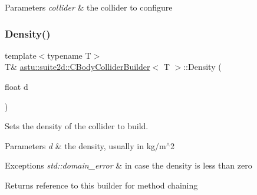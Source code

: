 \begin{DoxyParams}{Parameters}
{\em collider} & the collider to configure \\
\hline
\end{DoxyParams}
\mbox{\label{classastu_1_1suite2d_1_1CBodyColliderBuilder_a7bedba690f689f1da7650084975a339e}} 
\subsubsection{\texorpdfstring{Density()}{Density()}}
{\footnotesize\ttfamily template$<$typename T$>$ \\
T\& \hyperlink{classastu_1_1suite2d_1_1CBodyColliderBuilder}{astu\+::suite2d\+::\+C\+Body\+Collider\+Builder}$<$ T $>$\+::Density (\begin{DoxyParamCaption}\item[{float}]{d }\end{DoxyParamCaption})\hspace{0.3cm}{\ttfamily [inline]}}

Sets the density of the collider to build.


\begin{DoxyParams}{Parameters}
{\em d} & the density, usually in kg/m$^\wedge$2 \\
\hline
\end{DoxyParams}

\begin{DoxyExceptions}{Exceptions}
{\em std\+::domain\+\_\+error} & in case the density is less than zero \\
\hline
\end{DoxyExceptions}
\begin{DoxyReturn}{Returns}
reference to this builder for method chaining 
\end{DoxyReturn}
\mbox{\label{classastu_1_1suite2d_1_1CBodyColliderBuilder_a5d0fe75d5cc5cb4c3c1a6a503d34d641}} 

